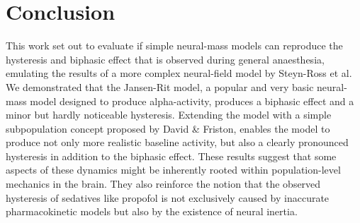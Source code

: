\section{Conclusion}
This work set out to evaluate if simple neural-mass models can reproduce the hysteresis and biphasic effect
that is observed during general anaesthesia,
emulating the results of a more complex neural-field model by Steyn-Ross et al.
We demonstrated that the Jansen-Rit model,
a popular and very basic neural-mass model designed to produce alpha-activity,
produces a biphasic effect and a minor but hardly noticeable hysteresis.
Extending the model with a simple subpopulation concept proposed by David \& Friston, enables the model to produce
not only more realistic baseline activity, but also a clearly pronounced hysteresis in addition to the biphasic effect.
These results suggest that some aspects of these dynamics might be inherently rooted
within population-level mechanics in the brain.
They also reinforce the notion that the observed hysteresis of sedatives like
propofol is not exclusively caused by inaccurate pharmacokinetic models but also by the existence of neural inertia.

